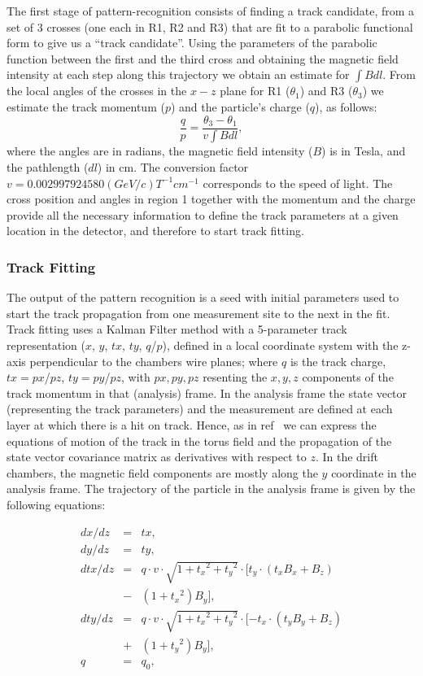 The first stage of
pattern-recognition consists of finding a track candidate, from a set of 3 crosses (one each in R1, R2 and R3) that
are fit to a parabolic functional form to give us a ``track candidate''.
Using the parameters of the parabolic function between the first and the third cross and obtaining the magnetic field
intensity at each step along this trajectory we obtain an estimate for $\int B dl$.
From the local angles of the crosses in the $x-z$ plane for R1 ($\theta_1$) and R3 ($\theta_3$) we estimate the track momentum ($p$)
and the particle's charge ($q$),
as follows:
\begin{equation}\frac{q}{p} = \frac{\theta_3 - \theta_1}{v\int{B dl}},\end{equation} where the angles are in radians, the magnetic field
intensity ($B$) is in Tesla, and the pathlength ($dl$) in cm.
The conversion factor  $v = 0.002997924580 (GeV/c) T^{-1} cm^{-1}$  corresponds to the speed of light.
The cross position and angles in region 1 together with the
momentum and the charge provide all the necessary information to define the track parameters at a given location in the detector,
and therefore to start track fitting.


\subsubsection{Track Fitting}
The output of the pattern recognition
is a seed with initial parameters used to start the track propagation from one measurement site to the next in the fit.
Track fitting uses a Kalman Filter method with a 5-parameter track representation ($x$, $y$, $tx$, $ty$, $q$/$p$), defined
in a local coordinate system with the z-axis perpendicular to the chambers wire planes; where $q$ is the
track charge, $tx=px$/$pz$,
$ty=py$/$pz$, with $px,py,pz$ resenting the $x,y,z$ components of the track momentum in that (analysis) frame.
In the analysis frame the state vector (representing the track parameters) and the measurement are defined at each layer
at which there is a hit on track.
Hence, as in ref~\cite{spiri} we can express the equations of motion of the track in the torus field
and the propagation of the state vector covariance matrix as derivatives with respect to $z$.
In the drift chambers, the magnetic field components are mostly along the $y$ coordinate in the analysis frame.
The trajectory of the particle in the analysis frame is given by the following equations:

\begin{eqnarray*}
dx/dz  &=& tx, \\
dy/dz  &=&  ty, \\
dtx/dz &=& q \cdot v \cdot \sqrt{1 + {t_x}^2 + {t_y}^2}\cdot [t_y\cdot (t_x B_x + B_z)\\ &-& (1 + {t_x}^2 ) B_y], \\
dty/dz  &=&  q \cdot v \cdot \sqrt{1 + {t_x}^2 + {t_y}^2}\cdot [-t_x\cdot (t_y B_y + B_z) \\&+& (1 + {t_y}^2 ) B_y], \\
q  &=&  q_0,
\end{eqnarray*}


